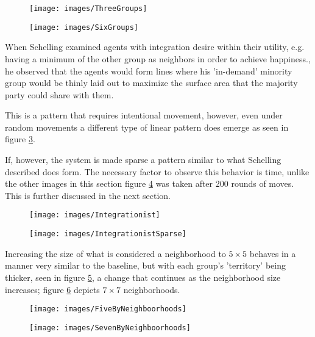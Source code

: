 \documentclass[sigplan,nonacm]{acmart}
\begin{document}
\begin{figure}
	\centering
	\texttt{[image: images/ThreeGroups]}
	\caption{}
	\label{fig:threegroups}
\end{figure}
\begin{figure}
	\centering
	\texttt{[image: images/SixGroups]}
	\caption{}
	\label{fig:sixgroups}
\end{figure}

When Schelling examined agents with integration desire within their utility, 
e.g. having a minimum of the other group as neighbors in order to achieve happiness.,
he observed that the agents would form lines where his 'in-demand' minority group would be thinly laid out to maximize the 
surface area that the majority party could share with them.

This is a pattern that requires intentional movement, however, 
even under random movements a different type of linear pattern does emerge as seen in figure \ref{fig:integrationist}.

If, however, the system is made sparse a pattern similar to what Schelling described does form.
The necessary factor to observe this behavior is time, unlike the other images in this section 
figure \ref{fig:integrationistsparse} was taken after 200 rounds of moves. 
This is further discussed in the next section.

\begin{figure}
	\centering
	\texttt{[image: images/Integrationist]}
	\caption{}
	\label{fig:integrationist}
\end{figure}
\begin{figure}
	\centering
	\texttt{[image: images/IntegrationistSparse]}
	\caption{}
	\label{fig:integrationistsparse}
\end{figure}


Increasing the size of what is considered a neighborhood to \(5\times5\) behaves in a manner very similar to the baseline,
but with each group's 'territory' being thicker, seen in figure \ref{fig:fivebyneighboorhoods}, a change that continues
as the neighborhood size increases; figure \ref{fig:sevenbyneighboorhoods} depicts \(7\times7\) neighborhoods.

\begin{figure}
	\centering
	\texttt{[image: images/FiveByNeighboorhoods]}
	\caption{}
	\label{fig:fivebyneighboorhoods}
\end{figure}
\begin{figure}
	\centering
	\texttt{[image: images/SevenByNeighboorhoods]}
	\caption{}
	\label{fig:sevenbyneighboorhoods}
\end{figure}
\end{document}
